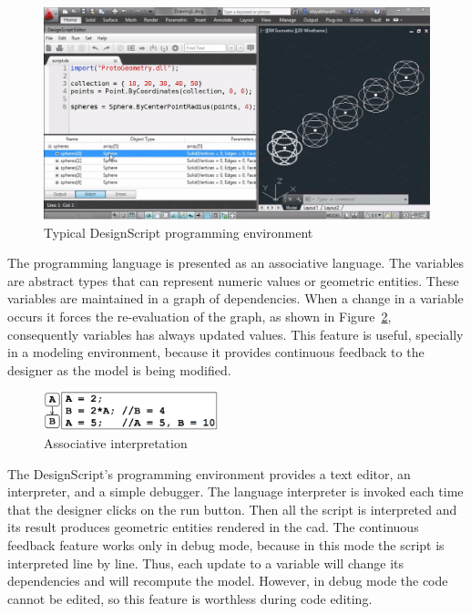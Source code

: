 \begin{figure}[!htbp]
  \centering
  \includegraphics[width=1.0\textwidth]{images/designScriptIDE}
    \caption{Typical DesignScript programming environment} 
  \label{fig:ds}
\end{figure} 

The programming language is presented as an associative language. The variables are abstract types that can represent numeric values or geometric entities. These variables are maintained in a graph of dependencies. When a change in a variable occurs it forces the re-evaluation of the graph, as shown in Figure~\ref{fig:designscript}, consequently variables has always updated values. This feature is useful, specially in a modeling environment, because it provides continuous feedback to the designer as the model is being modified.

\begin{figure}
  \begin{center}
    \includegraphics[width=0.45\textwidth]{images/designscript}
  \end{center}
 \caption{Associative interpretation}  
    \label{fig:designscript}
\end{figure}

The DesignScript's programming environment provides a text editor, an interpreter, and a simple debugger. The language interpreter is invoked each time that the designer clicks on the run button. Then all the script is interpreted and its result produces geometric entities rendered in the \gls{cad}. The continuous feedback feature works only in debug mode, because in this mode the script is interpreted line by line. Thus, each update to a variable will change its dependencies and will recompute the model. However, in debug mode the code cannot be edited, so this feature is worthless during code editing.


